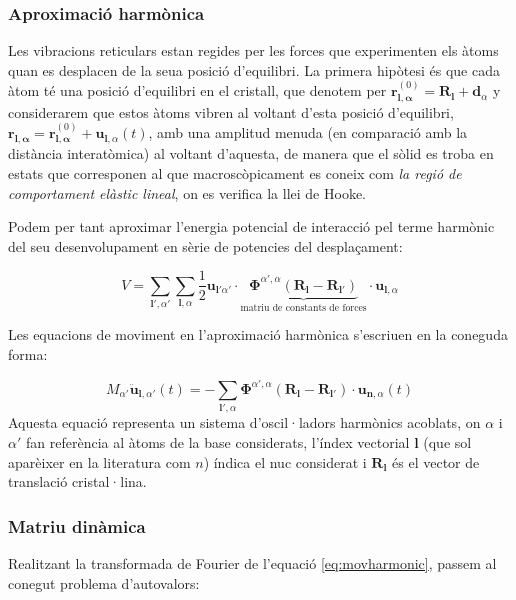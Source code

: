 \documentclass[12pt]{article} %
\let\vec\mathbf %
\begin{document}
  
\subsubsection{Aproximació harmònica}

Les vibracions reticulars estan regides per les forces que experimenten els àtoms quan es desplacen de la seua posició d'equilibri. La primera hipòtesi és que cada àtom té una posició d'equilibri en el cristall, que denotem per $\vec r^{(0)}_{\vec l,\vec\alpha}=\vec R_\vec l+\vec d_\alpha$ y considerarem que estos àtoms vibren al voltant d'esta posició d'equilibri, $\vec r_{\vec l,\vec\alpha}=\vec r^{(0)}_{\vec l,\vec\alpha}+\vec u_{\vec l,\alpha}(t)$, amb una amplitud menuda (en comparació amb la distància interatòmica) al voltant d'aquesta,   de manera que el sòlid es troba en estats que corresponen al que macroscòpicament es coneix com \textit{la regió de comportament elàstic lineal}, on es verifica la llei de Hooke.

Podem per tant aproximar l'energia potencial de interacció pel terme harmònic del seu desenvolupament en sèrie de potencies del despla\c{c}ament:

\begin{equation}
 V=\sum_{\vec l',\alpha'}\sum_{\vec l,\alpha}\frac{1}{2}\vec u_{\vec l'\alpha'}\cdot\underbrace{\vec\Phi^{\alpha',\alpha}(\vec R_{\vec l}-\vec R_{\vec l'})}_\text{matriu de constants de forces}\cdot\vec u_{\vec l,\alpha}
\end{equation}

Les equacions de moviment en l'aproximació harmònica s'escriuen en la coneguda forma:

\begin{equation}
\label{eq:movharmonic}
 M_{\alpha'}\vec{\ddot{u}}_{\vec l,\alpha'}(t)=-\sum_{\vec l',\alpha}\vec\Phi^{\alpha',\alpha}\left(\vec R_\vec l-\vec R_{\vec l'}\right)\cdot\vec u_{\vec n,\alpha}(t)
\end{equation}
 Aquesta equació representa un sistema  d'oscil·ladors harmònics acoblats, on $\alpha$ i $\alpha'$ fan referència al àtoms de la base considerats, l'índex vectorial $\vec l$ (que sol aparèixer en la literatura com $n$) índica el nuc considerat i $\vec R_\vec l$ és el vector de translació cristal·lina.
 
\subsubsection{Matriu dinàmica}
Realitzant la transformada de Fourier de l'equació \ref{eq:movharmonic}, passem al conegut problema d'autovalors:
\end{document}
